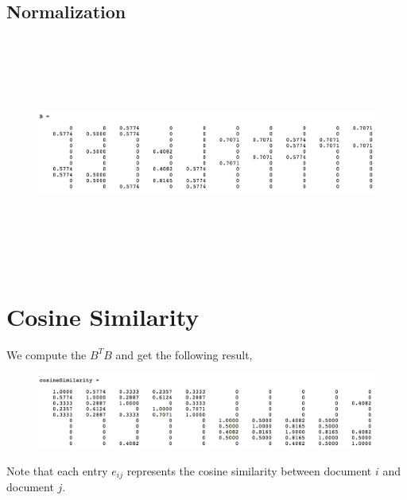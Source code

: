\documentclass[11pt,a4paper]{article}
\begin{document}
\subsection{Normalization}
\begin{figure}[h]
    \centering
\includegraphics[width=6.5in,height=3in]{./B.png} \\
\end{figure}
\newpage

\section{Cosine Similarity}
We compute the $B^T B$ and get the following result,

\begin{figure}[h]
    \centering
    \includegraphics[width=6.5in,height=3.in]{./cosine.png} \\
\end{figure}

Note that each entry $e_{ij}$ represents the cosine similarity between
document $i$ and document $j$.
\newpage
\end{document}
